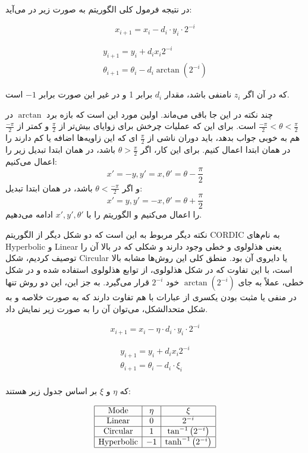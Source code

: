 \documentclass[12pt,titlepage,a4page , tikz , multi,table , svgnames,xcdraw]{article}
\begin{document}
در نتیجه فرمول کلی الگوریتم به صورت زیر در می‌آید:

$$x_{i+1}=x_{i}- d_{i} \cdot y_{i} \cdot 2^{-i}$$

$$\begin{array}{c}
y_{i+1}=y_{i}+d_{i} x_{i} 2^{-i} \\
\theta_{i+1}=\theta_{i}-d_{i} \arctan(2^{-i})
\end{array}$$

که در آن اگر $z_i$ نامنفی باشد، مقدار $d_i$ برابر 1 و در غیر این صورت برابر $-1$ است.

چند نکته در این جا باقی می‌ماند. اولین مورد این است که بازه برد $\arctan$ در
$\frac{-\pi}{2} < \theta < \frac{\pi}{2}$
است. برای این که عملیات چرخش برای زوایای بیش‌تر از $\frac{\pi}{2}$ و کمتر از 
$\frac{-\pi}{2}$
هم به خوبی جواب بدهد، باید دوران ناشی از $\frac{\pi}{2}$ ای که این زاویه‌ها اضافه یا کم دارند را در همان ابتدا اعمال کنیم.
برای این کار، اگر 
$\theta > \frac{\pi}{2}$
باشد، در همان ابتدا تبدیل زیر را اعمال می‌کنیم:
$$x' = -y , y' = x , \theta' = \theta - \frac{\pi}{2}$$
و اگر $\theta < \frac{-\pi}{2}$ باشد، در همان ابتدا تبدیل:
$$x' = y , y' = -x , \theta' = \theta + \frac{\pi}{2}$$
را اعمال می‌کنیم و الگوریتم را با $x' , y' , \theta'$ ادامه می‌دهیم.

نکته دیگر مربوط به این است که دو شکل دیگر از الگوریتم CORDIC به نام‌های Hyperbolic و Linear یعنی هذلولوی و خطی وجود دارند و شکلی که در بالا آن را توصیف کردیم، شکل Circular یا دایروی آن بود. منطق کلی این روش‌ها مشابه بالا است، با این تفاوت که در شکل هذلولوی، از توابع هذلولوی استفاده شده و در شکل خطی، عملاً به جای $\arctan(2^{-i})$ خود $2^{-i}$ قرار می‌گیرد. به جز این، این دو روش تنها در منفی یا مثبت بودن یکسری از عبارات با هم تفاوت دارند که به صورت خلاصه و به شکل متحدالشکل، می‌توان آن را به صورت زیر نمایش داد.

$$x_{i+1}=x_{i}- \eta \cdot d_{i} \cdot y_{i} \cdot 2^{-i}$$

$$\begin{array}{c}
y_{i+1}=y_{i}+d_{i} x_{i} 2^{-i} \\
\theta_{i+1}=\theta_{i}-d_{i} \cdot \xi_i \\
\end{array}$$

که $\eta$ و $\xi$ بر اساس جدول زیر هستند:

$$\begin{array}{|c|c|c|}
\hline \text { Mode } & \eta & \xi \\
\hline \text {Linear} & 0 & 2^{-i} \\
\hline \text {Circular} & 1 & \tan ^{-1}\left(2^{-i}\right) \\
\hline \text {Hyperbolic} & -1 & \tanh ^{-1}\left(2^{-i}\right) \\
\hline
\end{array}$$
\end{document}
